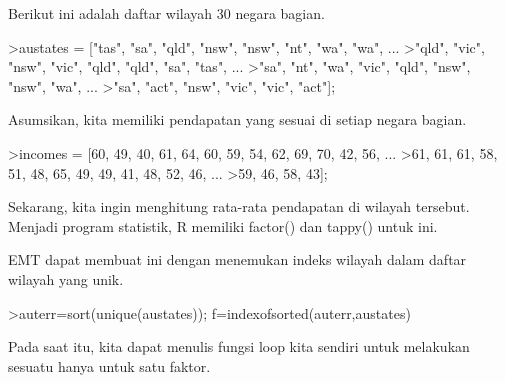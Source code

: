 \documentclass[a4paper,10pt]{article}
\begin{document}
\begin{eulernotebook}
\begin{eulercomment}
\begin{eulercomment}
\begin{eulercomment}
\begin{eulercomment}
\begin{eulercomment}
Berikut ini adalah daftar wilayah 30 negara bagian.
\end{eulercomment}
\begin{eulerprompt}
>austates = ["tas", "sa", "qld", "nsw", "nsw", "nt", "wa", "wa", ...
>"qld", "vic", "nsw", "vic", "qld", "qld", "sa", "tas", ...
>"sa", "nt", "wa", "vic", "qld", "nsw", "nsw", "wa", ...
>"sa", "act", "nsw", "vic", "vic", "act"];
\end{eulerprompt}
\begin{eulercomment}
Asumsikan, kita memiliki pendapatan yang sesuai di setiap negara
bagian.
\end{eulercomment}
\begin{eulerprompt}
>incomes = [60, 49, 40, 61, 64, 60, 59, 54, 62, 69, 70, 42, 56, ...
>61, 61, 61, 58, 51, 48, 65, 49, 49, 41, 48, 52, 46, ...
>59, 46, 58, 43];
\end{eulerprompt}
\begin{eulercomment}
Sekarang, kita ingin menghitung rata-rata pendapatan di wilayah
tersebut. Menjadi program statistik, R memiliki factor() dan tappy()
untuk ini.

EMT dapat membuat ini dengan menemukan indeks wilayah dalam daftar
wilayah yang unik.
\end{eulercomment}
\begin{eulerprompt}
>auterr=sort(unique(austates)); f=indexofsorted(auterr,austates)
\end{eulerprompt}
\begin{euleroutput}
  [6,  5,  4,  2,  2,  3,  8,  8,  4,  7,  2,  7,  4,  4,  5,  6,  5,  3,
  8,  7,  4,  2,  2,  8,  5,  1,  2,  7,  7,  1]
\end{euleroutput}
\begin{eulercomment}
Pada saat itu, kita dapat menulis fungsi loop kita sendiri untuk
melakukan sesuatu hanya untuk satu faktor.


\end{eulercomment}
\end{eulercomment}
\end{eulercomment}
\end{eulercomment}
\end{eulercomment}
\end{eulernotebook}
\end{document}
